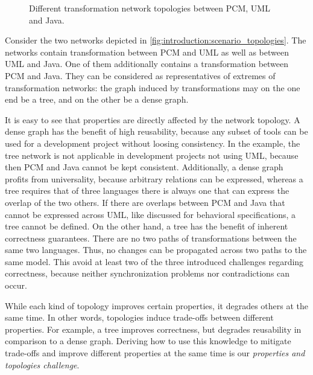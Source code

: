 \begin{figure}
    \centering
    
    \caption[Example for network topologies]{Different transformation network topologies between \gls{PCM}, \gls{UML} and Java.}
    \label{fig:introduction:scenario_topologies}
\end{figure}

Consider the two networks depicted in \autoref{fig:introduction:scenario_topologies}.
The networks contain transformation between \gls{PCM} and \gls{UML} as well as between \gls{UML} and Java. 
One of them additionally contains a transformation between \gls{PCM} and Java.
They can be considered as representatives of extremes of transformation networks:
the graph induced by transformations may on the one end be a tree, and on the other be a dense graph.

It is easy to see that properties are directly affected by the network topology.
A dense graph has the benefit of high reusability, because any subset of tools can be used for a development project without loosing consistency.
In the example, the tree network is not applicable in development projects not using \gls{UML}, because then \gls{PCM} and Java cannot be kept consistent.
Additionally, a dense graph profits from universality, because arbitrary relations can be expressed, whereas a tree requires that of three languages there is always one that can express the overlap of the two others.
If there are overlaps between \gls{PCM} and Java that cannot be expressed across \gls{UML}, like discussed for behavioral specifications, a tree cannot be defined.
On the other hand, a tree has the benefit of inherent correctness guarantees.
There are no two paths of transformations between the same two languages.
Thus, no changes can be propagated across two paths to the same model.
This avoid at least two of the three introduced challenges regarding correctness, because neither synchronization problems nor contradictions can occur.

While each kind of topology improves certain properties, it degrades others at the same time.
In other words, topologies induce trade-offs between different properties.
For example, a tree improves correctness, but degrades reusability in comparison to a dense graph.
Deriving how to use this knowledge to mitigate trade-offs and improve different properties at the same time is our \emph{properties and topologies challenge}.


